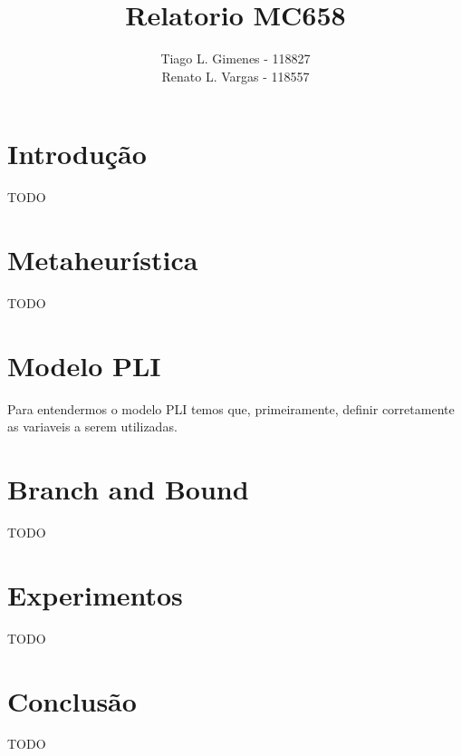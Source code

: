\documentclass[a4paper,11pt,twoside]{article}
\title{Relatorio MC658}
\author{Tiago L. Gimenes - 118827\\
        Renato L. Vargas - 118557}
\begin{document}
\maketitle

\section{Introdução}
TODO

\section{Metaheurística}
TODO

\section{Modelo PLI}
Para entendermos o modelo PLI temos que, primeiramente, definir corretamente as
variaveis a serem utilizadas.

\section{Branch and Bound}
TODO

\section{Experimentos}
TODO

\section{Conclusão}
TODO
\end{document}

